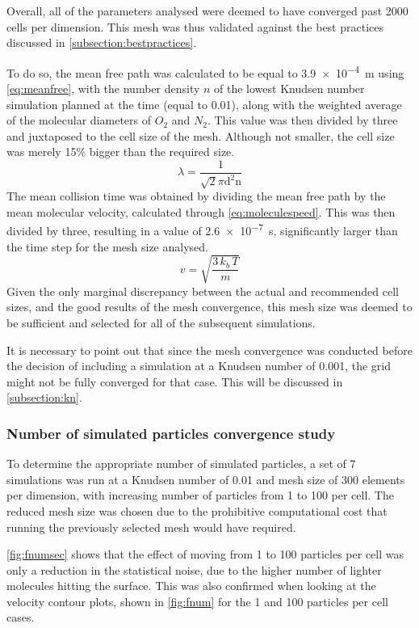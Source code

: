 Overall, all of the parameters analysed were deemed to have converged past 2000 cells per dimension. This mesh was thus validated against the best practices discussed in \autoref{subsection:bestpractices}.

To do so, the mean free path was calculated to be equal to \qty{3.9e-4}{\m} using \autoref{eq:meanfree}, with the number density $n$ of the lowest Knudsen number simulation planned at the time (equal to 0.01), along with the weighted average of the molecular diameters of $O_2$ and $N_2$. This value was then divided by three and juxtaposed to the cell size of the mesh. Although not smaller, the cell size was merely 15\% bigger than the required size.
\begin{equation}
    \lambda=\frac{1}{\sqrt{2} \pi \mathrm{d}^2 \mathrm{n}}
    \label{eq:meanfree}
\end{equation}
The mean collision time was obtained by dividing the mean free path by the mean molecular velocity, calculated through \autoref{eq:moleculespeed}. This was then divided by three, resulting in a value of \qty{2.6e-7}{\s}, significantly larger than the time step for the mesh size analysed.
\begin{equation}
    v =\sqrt{\frac{3\, k_b\, T}{m}}
    \label{eq:moleculespeed}
\end{equation}
Given the only marginal discrepancy between the actual and recommended cell sizes, and the good results of the mesh convergence, this mesh size was deemed to be sufficient and selected for all of the subsequent simulations.

It is necessary to point out that since the mesh convergence was conducted before the decision of including a simulation at a Knudsen number of 0.001, the grid might not be fully converged for that case. This will be discussed in \autoref{subsection:kn}.

\subsubsection{Number of simulated particles convergence study}
\label{subsection:fnum}
To determine the appropriate number of simulated particles, a set of 7 simulations was run at a Knudsen number of 0.01 and mesh size of 300 elements per dimension, with increasing number of particles from 1 to 100 per cell. The reduced mesh size was chosen due to the prohibitive computational cost that running the previously selected mesh would have required.

\autoref{fig:fnumsec} shows that the effect of moving from 1 to 100 particles per cell was only a reduction in the statistical noise, due to the higher number of lighter molecules hitting the surface. This was also confirmed when looking at the velocity contour plots, shown in \autoref{fig:fnum} for the 1 and 100 particles per cell cases.

